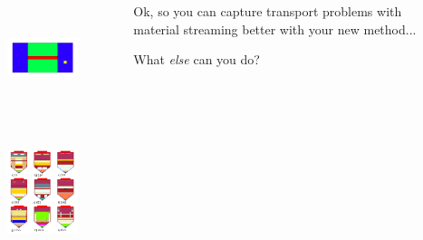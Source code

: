 \documentclass[xcolor=x11names,compress]{beamer}
\renewcommand{\(}{\begin{columns}}
\renewcommand{\)}{\end{columns}}
\newcommand{\<}[1]{\begin{column}{#1}}
\renewcommand{\>}{\end{column}}
\begin{document}
\section*{}
\begin{frame}[fragile]
  \frametitle{}
\begin{columns}
  \begin{column}{0.6\textwidth}
  	\begin{figure}
  	\begin{center}
  		\includegraphics[height=1.25in,clip]{../figs/steel-beam.png}\\
  		\includegraphics[height=1.75in,clip]{../figs/snapshots.png}
	\end{center}
  	\end{figure}
  \end{column}
  \begin{column}{0.4\textwidth}
  Ok, so you can capture transport problems with material streaming better with your new method...
  
  \vspace*{2 em}
  What \textit{else} can you do?
  \end{column}
\end{columns}
\end{frame}


\end{document}
